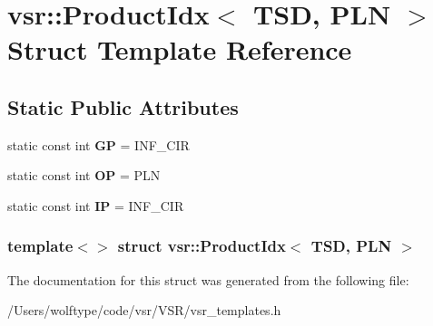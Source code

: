 \hypertarget{structvsr_1_1_product_idx_3_01_t_s_d_00_01_p_l_n_01_4}{\section{vsr\-:\-:Product\-Idx$<$ T\-S\-D, P\-L\-N $>$ Struct Template Reference}
\label{structvsr_1_1_product_idx_3_01_t_s_d_00_01_p_l_n_01_4}
}
\subsection*{Static Public Attributes}
\begin{DoxyCompactItemize}
\item 
\hypertarget{structvsr_1_1_product_idx_3_01_t_s_d_00_01_p_l_n_01_4_a45334ed6728e15839b1c92cb4ee11907}{static const int {\bfseries G\-P} = I\-N\-F\-\_\-\-C\-I\-R}\label{structvsr_1_1_product_idx_3_01_t_s_d_00_01_p_l_n_01_4_a45334ed6728e15839b1c92cb4ee11907}

\item 
\hypertarget{structvsr_1_1_product_idx_3_01_t_s_d_00_01_p_l_n_01_4_ab480442bec96a1e641f44133368d9a27}{static const int {\bfseries O\-P} = P\-L\-N}\label{structvsr_1_1_product_idx_3_01_t_s_d_00_01_p_l_n_01_4_ab480442bec96a1e641f44133368d9a27}

\item 
\hypertarget{structvsr_1_1_product_idx_3_01_t_s_d_00_01_p_l_n_01_4_a0760989025bf804c8159994d5d722a99}{static const int {\bfseries I\-P} = I\-N\-F\-\_\-\-C\-I\-R}\label{structvsr_1_1_product_idx_3_01_t_s_d_00_01_p_l_n_01_4_a0760989025bf804c8159994d5d722a99}

\end{DoxyCompactItemize}
\subsubsection*{template$<$$>$ struct vsr\-::\-Product\-Idx$<$ T\-S\-D, P\-L\-N $>$}



The documentation for this struct was generated from the following file\-:\begin{DoxyCompactItemize}
\item 
/\-Users/wolftype/code/vsr/\-V\-S\-R/vsr\-\_\-templates.\-h\end{DoxyCompactItemize}
